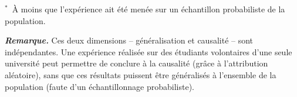 \documentclass[11pt,french]{article}
\newcommand{\remarque}[1]{%
  \medskip\noindent\textit{\textbf{Remarque.}} #1\medskip}
\begin{document}
{\footnotesize $^{*}$~À moins que l'expérience ait été menée sur un échantillon probabiliste
de la population.}

\bigskip

\remarque{Ces deux dimensions -- généralisation et causalité -- sont indépendantes. Une
expérience réalisée sur des étudiants volontaires d'une seule université peut permettre de
conclure à la causalité (grâce à l'attribution aléatoire), sans que ces résultats puissent
être généralisés à l'ensemble de la population (faute d'un échantillonnage probabiliste).}
\end{document}
